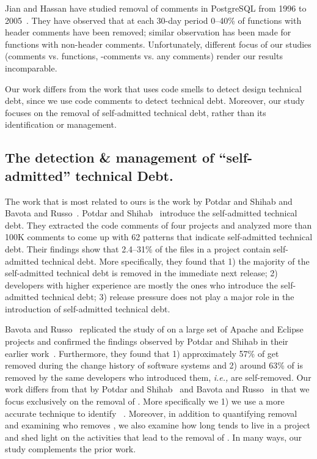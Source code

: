 Jian and Hassan have studied removal of comments in PostgreSQL from 1996 to 2005~\cite{Jiang:Hassan}. They have observed that at each 30-day period 0--40\% of functions with header comments have been removed; similar observation has been made for functions with non-header comments. Unfortunately, different focus of our studies (comments vs. functions, \SATD-comments vs. any comments) render our results incomparable.


Our work differs from the work that uses code smells to detect design technical debt, since we use code comments to detect technical debt. Moreover, our study focuses on the removal of self-admitted technical debt, rather than its identification or management.




\subsection{The detection \& management of ``self-admitted'' technical Debt.} 

The work that is most related to ours is the work by Potdar and Shihab\cite{Potdar2014ICSME} and Bavota and Russo~\cite{Bavota2016MSR}. Potdar and Shihab~\cite{Potdar2014ICSME} introduce the self-admitted technical debt. They extracted the code comments of four projects and analyzed more than 100K comments to come up with 62  patterns that indicate self-admitted technical debt. Their findings show that 2.4--31\% of the files in a project contain self-admitted technical debt. More specifically, they found that 1) the majority of the self-admitted technical debt is removed in the immediate next release; 2) developers with higher experience are mostly the ones who introduce the self-admitted technical debt; 3) release pressure does not play a major role in the introduction of self-admitted technical debt.

Bavota and Russo~\cite{Bavota2016MSR} replicated the study of \SATD on a large set of Apache and Eclipse projects and confirmed the findings observed by Potdar and Shihab in their earlier work~\cite{Potdar2014ICSME}. Furthermore, they found that 1) approximately 57\% of \SATD get removed during the change history of software systems and 2) around 63\% of \SATD is removed by the same developers who introduced them, \emph{i.e.,} are self-removed. Our work differs from that by Potdar and Shihab~\cite{Potdar2014ICSME} and Bavota and Russo~\cite{Bavota2016MSR} in that we focus exclusively on the removal of \SATD. More specifically we 1) we use a more accurate technique to identify \SATD~\cite{Maldonado2015TSE}. Moreover, in addition to quantifying removal and examining who removes \SATD, we also examine how long \SATD tends to live in a project and shed light on the activities that lead to the removal of \SATD. In many ways, our study complements the prior work.

